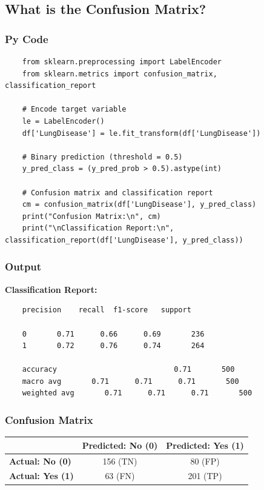 \documentclass[a4paper,12pt]{article}
\begin{document}

\subsection{What is the Confusion Matrix?}

\subsubsection{Py Code}
\begin{lstlisting}
	from sklearn.preprocessing import LabelEncoder
	from sklearn.metrics import confusion_matrix, classification_report
	
	# Encode target variable
	le = LabelEncoder()
	df['LungDisease'] = le.fit_transform(df['LungDisease'])
	
	# Binary prediction (threshold = 0.5)
	y_pred_class = (y_pred_prob > 0.5).astype(int)
	
	# Confusion matrix and classification report
	cm = confusion_matrix(df['LungDisease'], y_pred_class)
	print("Confusion Matrix:\n", cm)
	print("\nClassification Report:\n", classification_report(df['LungDisease'], y_pred_class))
\end{lstlisting}
\subsubsection{Output}
\textbf{Classification Report:}

\begin{verbatim}
	precision    recall  f1-score   support
	
	0       0.71      0.66      0.69       236
	1       0.72      0.76      0.74       264
	
	accuracy                           0.71       500
	macro avg       0.71      0.71      0.71       500
	weighted avg       0.71      0.71      0.71       500
\end{verbatim}


\subsubsection{Confusion Matrix}
\begin{center}
	\begin{tabular}{|l|c|c|}
		\hline
		& \textbf{Predicted: No (0)} & \textbf{Predicted: Yes (1)} \\
		\hline
		\textbf{Actual: No (0)} & 156 (TN)  & 80 (FP)  \\
		\hline
		\textbf{Actual: Yes (1)} & 63 (FN)  & 201 (TP)  \\
		\hline
	\end{tabular}
\end{center}
\end{document}
